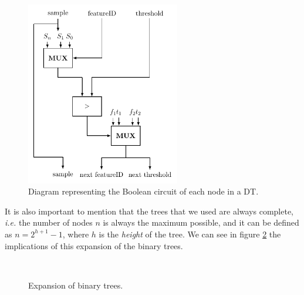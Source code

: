 \begin{figure}[!ht]
  \centering
  \includegraphics[width=0.60\textwidth]{images/decision_tree_node.pdf}
  \caption{Diagram representing the Boolean circuit of each node in a \ac{DT}.}
  \label{fig:DTNode}
\end{figure}


It is also important to mention that the trees that we used are always complete, \textit{i.e.} the number of nodes $n$ is always the maximum possible, and it can be defined as $n=2^{h+1}-1$, where $h$ is the \textit{height} of the tree. We can see in figure \ref{fig:ExpansionBinaryTrees} the implications of this expansion of the binary trees.

\begin{figure}
	\centering
	\mbox{
	}
	\label{fig:ExpansionBinaryTrees}
	\caption{Expansion of binary trees.}
\end{figure}


